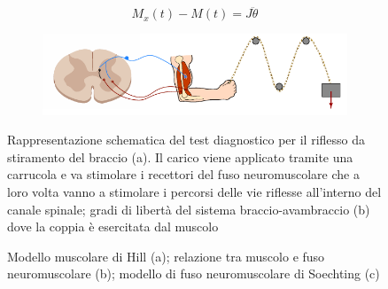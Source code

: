 \begin{equation}
	M_{x}(t)-M(t)=J \ddot{\theta}
\end{equation}

\begin{figure}[t!]
	\centering
	\begin{subfigure}{0.7\linewidth}
		\centering
	\includegraphics[width=0.95\linewidth]{figures/avambraccio_schema}\caption{}
	\end{subfigure}\hfill
\begin{subfigure}{0.3\linewidth}
	\centering
\footnotesize{\def\svgwidth{0.9\linewidth}
}
\caption{}
\end{subfigure}
	\caption{Rappresentazione schematica del test diagnostico per il riflesso da stiramento del braccio (a). Il carico viene applicato tramite una carrucola e va stimolare i recettori del fuso neuromuscolare che a loro volta vanno a stimolare i percorsi delle vie riflesse all'interno del canale spinale; gradi di libertà del sistema braccio-avambraccio (b) dove la coppia è esercitata dal muscolo}
	\label{fig:avambraccio}
\end{figure}

\begin{figure}[h!]
	\centering
	\begin{subfigure}{0.33\linewidth}
		\centering
		\footnotesize{\def\svgwidth{0.9\linewidth}
			}
		\caption{}
	\end{subfigure}\hfill
\begin{subfigure}{0.33\linewidth}
	\centering
	\tiny{\def\svgwidth{0.8\linewidth}
		}
	\caption{}
\end{subfigure}\hfill
	\begin{subfigure}{0.33\linewidth}
	\centering
	\footnotesize{\def\svgwidth{0.9\linewidth}
		}
	\caption{}
\end{subfigure}\hfill
	\caption{Modello muscolare di Hill (a); relazione tra muscolo e fuso neuromuscolare (b); modello di fuso neuromuscolare di Soechting (c)}
	\label{fig:fuso}
\end{figure}





